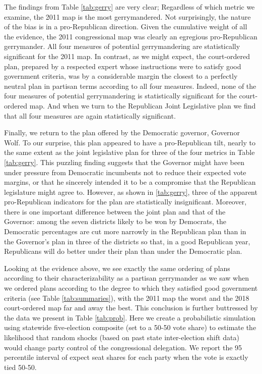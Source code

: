     The findings from Table \ref{tab:gerry} are very clear; Regardless of which metric we examine, the 2011 map is the most gerrymandered. Not surprisingly, the nature of the bias is in a pro-Republican direction. Given the cumulative weight of all the evidence, the 2011 congressional map was clearly an egregious pro-Republican gerrymander. All four measures of potential gerrymandering are statistically significant for the 2011 map. In contrast, as we might expect, the court-ordered plan, prepared by a respected expert whose instructions were to satisfy good government criteria, was by a considerable margin the closest to a perfectly neutral plan in partisan terms according to all four measures. Indeed, none of the four measures of potential gerrymandering is statistically significant for the court-ordered map. And when we turn to the Republican Joint Legislative plan we find that all four measures are again statistically significant.  
\par
    Finally, we return to the plan offered by the Democratic governor, Governor Wolf. To our surprise, this plan appeared to have a pro-Republican tilt, nearly to the same extent as the joint legislative plan for three of the four metrics in Table \ref{tab:gerry}. This puzzling finding suggests that the Governor might have been under pressure from Democratic incumbents not to reduce their expected vote margins, or that he sincerely intended it to be a compromise that the Republican legislature might agree to. However, as shown in \ref{tab:gerry}, three of the apparent pro-Republican indicators for the plan are statistically insignificant. Moreover, there is one important difference between the joint plan and that of the Governor: among the seven districts likely to be won by Democrats, the Democratic percentages are cut more narrowly in the Republican plan than in the Governor’s plan in three of the districts so that, in a good Republican year, Republicans will do better under their plan than under the Democratic plan.
\par	
    Looking at the evidence above, we see exactly the same ordering of plans according to their characterizability as a partisan gerrymander as we saw when we ordered plans according to the degree to which they satisfied good government criteria (see Table \ref{tab:summaries}), with the 2011 map the worst and the 2018 court-ordered map far and away the best. This conclusion is further buttressed by the data we present in Table \ref{tab:prob}. Here we create a probabilistic simulation using statewide five-election composite (set to a 50-50 vote share) to estimate the likelihood that random shocks (based on past state inter-election shift data) would change party control of the congressional delegation. We report the 95 percentile interval of expect seat shares for each party when the vote is exactly tied 50-50.
